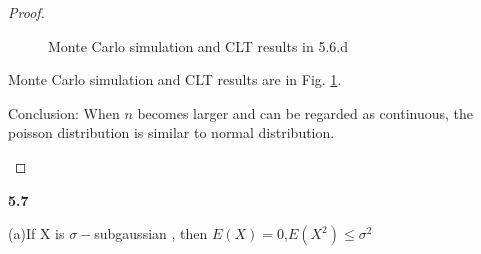 \begin{proof}
\begin{enumerate}
\begin{figure}[htbp]
		
		\centering
		\caption{Monte Carlo simulation and CLT results in 5.6.d}
		\label{pics56}
		\end{figure}

		Monte Carlo simulation and CLT results are in Fig. \ref{pics56}.

		Conclusion: When $n$ becomes larger and can be regarded as continuous, the poisson distribution is similar to normal distribution.
\end {enumerate}
\end{proof}


\noindent\textbf{5.7}


(a)If X is $\sigma-$subgaussian , then $E(X)=0$,$E(X^2)\leq\sigma^2$

